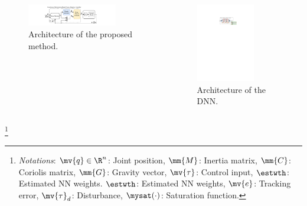 \documentclass[8pt, aspectratio=169]{beamer}
\begin{document}
\begin{frame}{\insertsubsectionhead}
\begin{columns}
      \begin{figure}
        \includegraphics[width=0.8\textwidth]{figures/Controller.drawio.pdf}
        \caption{Architecture of the proposed method.}
      \end{figure}

      \begin{figure}
        \includegraphics[width=0.7\textwidth]{figures/DNN.drawio.pdf}
        \caption{Architecture of the DNN.}
      \end{figure}

  \end{columns}

    \let\thefootnote\relax\footnote{
      \textit{Notations}: 
        $\mv{q}\in\R^n$: Joint position, $\mm{M}$: Inertia matrix, $\mm{C}$: Coriolis matrix, $\mm{G}$: Gravity vector, $\mv{\tau}$: Control input, $\estwth$: Estimated NN weights.
        $\estwth$: Estimated NN weights, $\mv{e}$: Tracking error, $\mv{\tau}_d$: Disturbance, $\mysat(\cdot)$: Saturation function.
      }

\end{frame}
\end{document}
